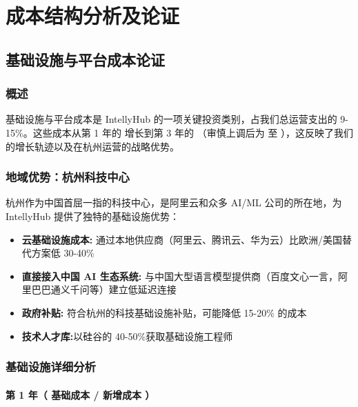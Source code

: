 \documentclass[11点, A4纸, 单面]{article}
\begin{document}


\restoregeometry
\endgroup

\section{成本结构分析及论证}
\label{sec:cost-analysis}

\subsection{基础设施与平台成本论证}

\subsubsection{概述}
基础设施与平台成本是 IntellyHub 的一项关键投资类别，占我们总运营支出的 9-15\%。这些成本从第 1 年的  增长到第 3 年的 （审慎上调后为  至 ），这反映了我们的增长轨迹以及在杭州运营的战略优势。

\subsubsection{地域优势：杭州科技中心}
杭州作为中国首屈一指的科技中心，是阿里云和众多 AI/ML 公司的所在地，为 IntellyHub 提供了独特的基础设施优势：

\begin{itemize}
    \item \textbf{云基础设施成本:} 通过本地供应商（阿里云、腾讯云、华为云）比欧洲/美国替代方案低 30-40\%
    \item \textbf{直接接入中国 AI 生态系统:} 与中国大型语言模型提供商（百度文心一言，阿里巴巴通义千问等）建立低延迟连接
    \item \textbf{政府补贴:} 符合杭州的科技基础设施补贴，可能降低 15-20\% 的成本
    \item \textbf{技术人才库:}以硅谷的 40-50\%获取基础设施工程师
\end{itemize}

\subsubsection{基础设施详细分析}

\paragraph{第 1 年（ 基础成本 / 新增成本 ）}
\end{document}
